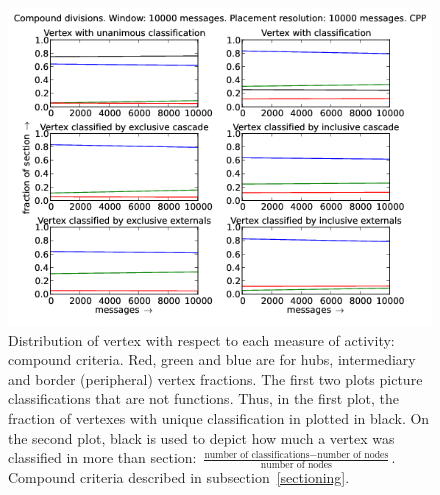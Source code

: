 \documentclass[%
 aip,
 jmp,%
 amsmath,amssymb,
 reprint,%
]{revtex4-1}
\begin{document}
\begin{figure}[hbtp] 
   \centering
        \includegraphics[width=\textwidth]{figs/CPP/10000_2}
    \caption{Distribution of vertex with respect to each measure of activity: compound criteria. Red, green and blue are for hubs, intermediary and border (peripheral) vertex fractions. The first two plots picture classifications that are not functions. Thus, in the first plot, the fraction of vertexes with unique classification in plotted in black. On the second plot, black is used to depict how much a vertex was classified in more than section: $\frac{\text{number of classifications} - \text{number of nodes}}{\text{number of nodes}}$. Compound criteria described in subsection~\ref{sectioning}.}
    \label{fig:cpp10000_}
\end{figure}
\end{document}

